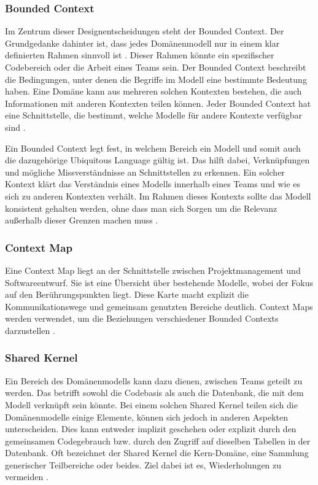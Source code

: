 {\subsubsection{Bounded Context}

Im Zentrum dieser Designentscheidungen steht der \glqq Bounded Context\grqq{}. Der Grundgedanke dahinter ist, dass jedes Domänenmodell nur in einem klar definierten Rahmen sinnvoll ist \cite[S. 45]{wolff}. Dieser Rahmen könnte ein spezifischer Codebereich oder die Arbeit eines Teams sein. Der Bounded Context beschreibt die Bedingungen, unter denen die Begriffe im Modell eine bestimmte Bedeutung haben. Eine Domäne kann aus mehreren solchen Kontexten bestehen, die auch Informationen mit anderen Kontexten teilen können. Jeder Bounded Context hat eine Schnittstelle, die bestimmt, welche Modelle für andere Kontexte verfügbar sind \cite[S.57]{newman}.

Ein Bounded Context legt fest, in welchem Bereich ein Modell und somit auch die dazugehörige Ubiquitous Language gültig ist. Das hilft dabei, Verknüpfungen und mögliche Missverständnisse an Schnittstellen zu erkennen. Ein solcher Kontext klärt das Verständnis eines Modells innerhalb eines Teams und wie es sich zu anderen Kontexten verhält. Im Rahmen dieses Kontexts sollte das Modell konsistent gehalten werden, ohne dass man sich Sorgen um die Relevanz außerhalb dieser Grenzen machen muss \cite[S. 335 - 340]{evans} \cite[S.64-65]{dowalil}.


\subsubsection{Context Map}

Eine \glqq Context Map\grqq{} liegt an der Schnittstelle zwischen Projektmanagement und Softwareentwurf. Sie ist eine Übersicht über bestehende Modelle, wobei der Fokus auf den Berührungspunkten liegt. Diese Karte macht explizit die Kommunikationswege und gemeinsam genutzten Bereiche deutlich. Context Maps werden verwendet, um die Beziehungen verschiedener Bounded Contexts darzustellen \cite[S. 344 - 353]{evans} \cite[S. 45]{wolff}.

\subsubsection{Shared Kernel}

Ein Bereich des Domänenmodells kann dazu dienen, zwischen Teams geteilt zu werden. Das betrifft sowohl die Codebasis als auch die Datenbank, die mit dem Modell verknüpft sein könnte. Bei einem solchen \glqq Shared Kernel\grqq{} teilen sich die Domänenmodelle einige Elemente, können sich jedoch in anderen Aspekten unterscheiden. Dies kann entweder implizit geschehen oder explizit durch den gemeinsamen Codegebrauch bzw. durch den Zugriff auf dieselben Tabellen in der Datenbank. Oft bezeichnet der  Shared Kernel die Kern-Domäne, eine Sammlung generischer Teilbereiche oder beides. Ziel dabei ist es, Wiederholungen zu vermeiden \cite[S. 354 - 355]{evans} \cite[S. 45]{wolff} \cite[S.65]{dowalil}.

}
